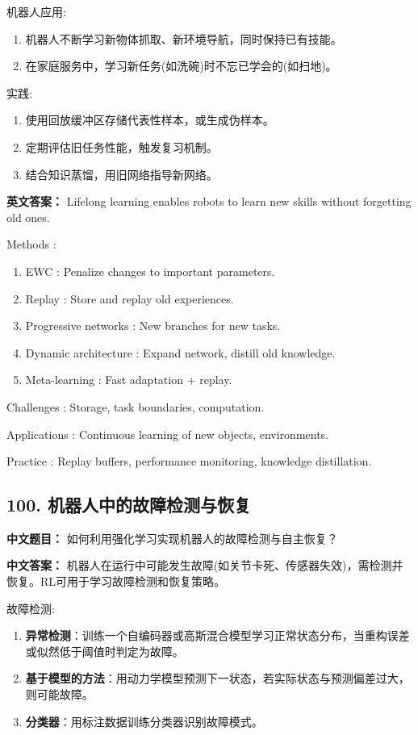 \documentclass[10pt,a4paper]{ctexart}
\begin{document}
 机器人应用:
\begin{enumerate}
    \item 机器人不断学习新物体抓取、新环境导航，同时保持已有技能。
    \item 在家庭服务中，学习新任务(如洗碗)时不忘已学会的(如扫地)。
\end{enumerate}

 实践:
\begin{enumerate}
    \item 使用回放缓冲区存储代表性样本，或生成伪样本。
    \item 定期评估旧任务性能，触发复习机制。
    \item 结合知识蒸馏，用旧网络指导新网络。
\end{enumerate}

\textbf{英文答案：}  
Lifelong learning enables robots to learn new skills without forgetting old ones.

 Methods :
\begin{enumerate}
    \item EWC : Penalize changes to important parameters.
    \item Replay : Store and replay old experiences.
    \item Progressive networks : New branches for new tasks.
    \item Dynamic architecture : Expand network, distill old knowledge.
    \item Meta-learning : Fast adaptation + replay.
\end{enumerate}

 Challenges : Storage, task boundaries, computation.

 Applications : Continuous learning of new objects, environments.

 Practice : Replay buffers, performance monitoring, knowledge distillation.

\subsection*{100. 机器人中的故障检测与恢复}
\textbf{中文题目：} 如何利用强化学习实现机器人的故障检测与自主恢复？

\textbf{中文答案：}  
机器人在运行中可能发生故障(如关节卡死、传感器失效)，需检测并恢复。RL可用于学习故障检测和恢复策略。

 故障检测:
\begin{enumerate}
    \item \textbf{异常检测}：训练一个自编码器或高斯混合模型学习正常状态分布，当重构误差或似然低于阈值时判定为故障。
    \item \textbf{基于模型的方法}：用动力学模型预测下一状态，若实际状态与预测偏差过大，则可能故障。
    \item \textbf{分类器}：用标注数据训练分类器识别故障模式。
\end{enumerate}
\end{document}
